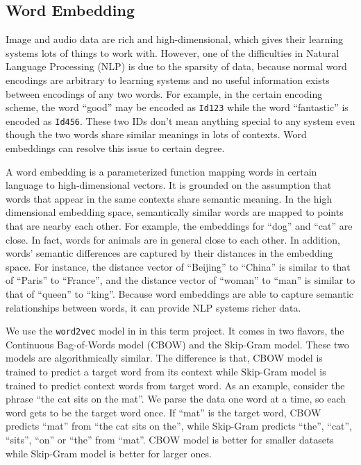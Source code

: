 \subsection{Word Embedding}

Image and audio data are rich and high-dimensional, which gives their learning systems lots of things to work with. However, one of the difficulties in Natural Language Processing (NLP) is due to the sparsity of data, because normal word encodings are arbitrary to learning systems and no useful information exists between encodings of any two words. For example, in the certain encoding scheme, the word ``good'' may be encoded as {\tt Id123} while the word ``fantastic'' is encoded as {\tt Id456}. These two IDs don't mean anything special to any system even though the two words share similar meanings in lots of contexts. Word embeddings can resolve this issue to certain degree.

A word embedding is a parameterized function mapping words in certain language to high-dimensional vectors. It is grounded on the assumption that words that appear in the same contexts share semantic meaning. In the high dimensional embedding space, semantically similar words are mapped to points that are nearby each other. For example, the embeddings for ``dog'' and ``cat'' are close. In fact, words for animals are in general close to each other. In addition, words' semantic differences are captured by their distances in the embedding space. For instance, the distance vector of ``Beijing'' to ``China'' is similar to that of ``Paris'' to ``France'', and the distance vector of ``woman'' to ``man'' is similar to that of ``queen'' to ``king''. Because word embeddings are able to capture semantic relationships between words, it can provide NLP systems richer data. 

We use the {\tt word2vec} model in \cite{mikolov2013} in this term project. It comes in two flavors, the Continuous Bag-of-Words model (CBOW) and the Skip-Gram model. These two models are algorithmically similar. The difference is that, CBOW model is trained to predict a target word from its context while Skip-Gram model is trained to predict context words from target word. As an example, consider the phrase ``the cat sits on the mat''. We parse the data one word at a time, so each word gets to be the target word once. If ``mat'' is the target word, CBOW predicts ``mat'' from ``the cat sits on the'', while Skip-Gram predicts ``the'', ``cat'', ``sits'', ``on'' or ``the'' from ``mat''. CBOW model is better for smaller datasets while Skip-Gram model is better for larger ones.
